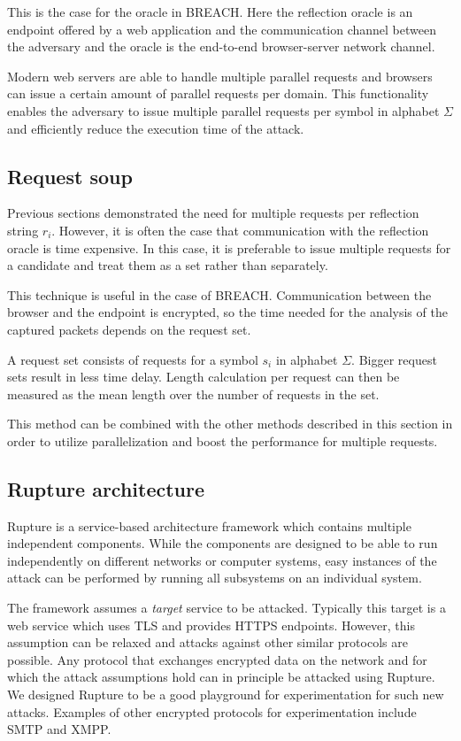 \documentclass[conference, letterpaper, 10pt]{IEEEtran}
\begin{document}
This is the case for the oracle in BREACH. Here the reflection oracle is an endpoint
offered by a web application and the communication channel between the adversary
and the oracle is the end-to-end browser-server network channel.

Modern web servers are able to handle multiple parallel requests and
browsers can issue a certain amount of parallel requests per domain. This
functionality enables the adversary to issue multiple parallel requests per
symbol in alphabet $\Sigma$ and efficiently reduce the execution time of
the attack.

\subsection{Request soup}
Previous sections demonstrated the need for multiple requests per reflection
string $r_i$. However, it is often the case that communication with the
reflection oracle is time
expensive. In this case, it is preferable to issue multiple
requests for a candidate and treat them as a set rather than separately.

This technique is useful in the case of BREACH. Communication between the browser and the
endpoint is encrypted, so the time needed for the analysis of
the captured packets depends on the request set.

A request set consists of requests for a symbol $s_i$ in alphabet
$\Sigma$.
Bigger request sets result in less time delay. Length calculation per request
can then be measured as the mean length over the number of requests in the set.

This method can be combined with the other methods described in this section
in order to utilize parallelization and boost the performance for
multiple requests.

\subsection{Rupture architecture}\label{app:rupture}
Rupture is a service-based architecture framework which contains multiple
independent components. While the components are designed to be able to run
independently on different networks or computer systems, easy instances of the
attack can be performed by running all subsystems on an individual system.

The framework assumes a \textit{target} service to be attacked. Typically
this target is a web service which uses TLS and
provides HTTPS endpoints. However, this assumption can
be relaxed and attacks against other similar protocols are possible. Any
protocol that exchanges encrypted data on the network and for which
the attack assumptions hold can in principle be attacked using Rupture. We
designed Rupture to be a good playground for experimentation for such new
attacks. Examples of other encrypted protocols for experimentation
include SMTP and XMPP.
\end{document}
